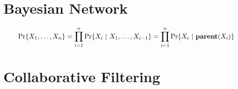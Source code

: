 \documentclass[10pt, twoside]{book}   	%
\begin{document}
\chapter{Bayesian Network}


\begin{equation}
\Pr\{X_1,\ldots,X_n\}
= \prod_{i=1}^n \Pr\{X_i~|~X_1,\ldots,X_{i-1}\}
= \prod_{i=1}^n \Pr\{X_i~|~\mathbf{parent}(X_i)\}
\end{equation}


\chapter{Collaborative Filtering}



%
%
%
%
%
\end{document}
